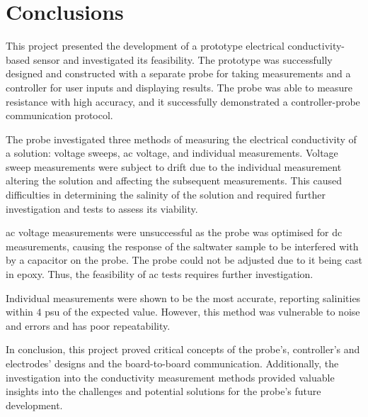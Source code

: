 \chapter{Conclusions}\label{ch:conclusions}

This project presented the development of a prototype electrical conductivity-based sensor and investigated its feasibility.
The prototype was successfully designed and constructed with a separate probe for taking measurements and a controller for user inputs and displaying results.
The probe was able to measure resistance with high accuracy, and it successfully demonstrated a controller-probe communication protocol.

The probe investigated three methods of measuring the electrical conductivity of a solution: voltage sweeps, \gls{ac} voltage, and individual measurements.
Voltage sweep measurements were subject to drift due to the individual measurement altering the solution and affecting the subsequent measurements.
This caused difficulties in determining the salinity of the solution and required further investigation and tests to assess its viability.

\gls{ac} voltage measurements were unsuccessful as the probe was optimised for \gls{dc} measurements, causing the response of the saltwater sample to be interfered with by a capacitor on the probe.
The probe could not be adjusted due to it being cast in epoxy.
Thus, the feasibility of \gls{ac} tests requires further investigation.

Individual measurements were shown to be the most accurate, reporting salinities within $4$ \gls{psu} of the expected value.        
However, this method was vulnerable to noise and errors and has poor repeatability.

In conclusion, this project proved critical concepts of the probe's,  controller's and electrodes' designs and the board-to-board communication.
Additionally, the investigation into the conductivity measurement methods provided valuable insights into the challenges and potential solutions for the probe's future development.
